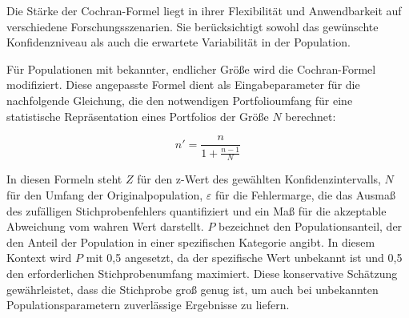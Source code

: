 Die Stärke der Cochran-Formel liegt in ihrer Flexibilität und Anwendbarkeit auf verschiedene Forschungsszenarien. Sie berücksichtigt sowohl das gewünschte Konfidenzniveau als auch die erwartete Variabilität in der Population.

Für Populationen mit bekannter, endlicher Größe wird die Cochran-Formel modifiziert. Diese angepasste Formel dient als Eingabeparameter für die nachfolgende Gleichung, die den notwendigen Portfolioumfang für eine statistische Repräsentation eines Portfolios der Größe $N$ berechnet:

\begin{equation}
n' = \frac{n}{1 + \frac{n - 1}{N}}
\end{equation}

In diesen Formeln steht $Z$ für den z-Wert des gewählten Konfidenzintervalls, $N$ für den Umfang der Originalpopulation, $\varepsilon$ für die Fehlermarge, die das Ausmaß des zufälligen Stichprobenfehlers quantifiziert und ein Maß für die akzeptable Abweichung vom wahren Wert darstellt. $P$ bezeichnet den Populationsanteil, der den Anteil der Population in einer spezifischen Kategorie angibt. In diesem Kontext wird $P$ mit 0,5 angesetzt, da der spezifische Wert unbekannt ist und 0,5 den erforderlichen Stichprobenumfang maximiert. Diese konservative Schätzung gewährleistet, dass die Stichprobe groß genug ist, um auch bei unbekannten Populationsparametern zuverlässige Ergebnisse zu liefern.